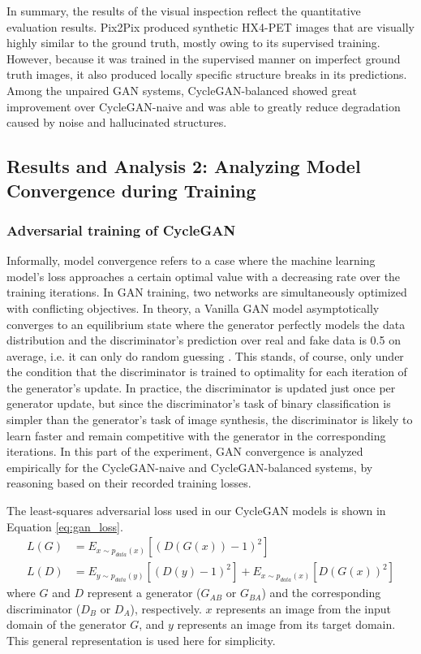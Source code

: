 In summary, the results of the visual inspection reflect the quantitative evaluation results. Pix2Pix produced synthetic HX4-PET images that are visually highly similar to the ground truth, mostly owing to its supervised training. However, because it was trained in the supervised manner on imperfect ground truth images, it also produced locally specific structure breaks in its predictions. Among the unpaired GAN systems, CycleGAN-balanced showed great improvement over CycleGAN-naive and was able to greatly reduce degradation caused by noise and hallucinated structures.


\subsection{Results and Analysis 2: Analyzing Model Convergence during Training}
\label{cycelgan_convergence}


\subsubsection{Adversarial training of CycleGAN} 
Informally, model convergence refers to a case where the machine learning model's loss approaches a certain optimal value with a decreasing rate over the training iterations. In GAN training, two networks are simultaneously optimized with conflicting objectives. In theory, a Vanilla GAN model asymptotically converges to an equilibrium state where the generator perfectly models the data distribution and the discriminator's prediction over real and fake data is 0.5 on average, i.e. it can only do random guessing \cite{goodfellow2014generative}. This stands, of course, only under the condition that the discriminator is trained to optimality for each iteration of the generator's update. In practice, the discriminator is updated just once per generator update, but since the discriminator's task of binary classification is simpler than the generator's task of image synthesis, the discriminator is likely to learn faster and remain competitive with the generator in the corresponding iterations. In this part of the experiment, GAN convergence is analyzed empirically for the CycleGAN-naive and CycleGAN-balanced systems, by reasoning based on their recorded training losses.

The least-squares adversarial loss used in our CycleGAN models is shown in Equation \ref{eq:gan_loss}.
\begin{equation}
    \begin{aligned}
    L(G) &= E_{x \sim p_{data}(x)} [(D(G(x)) - 1)^2] \\
    L(D) &= E_{y \sim p_{data}(y)} [(D(y) - 1)^2] + E_{x \sim p_{data}(x)} [D(G(x))^2]
    \end{aligned}
    \label{eq:gan_loss}
\end{equation}
where $G$ and $D$ represent a generator ($G_{AB}$ or $G_{BA}$) and the corresponding discriminator ($D_B$ or $D_A$), respectively. $x$ represents an image from the input domain of the generator $G$, and $y$ represents an image from its target domain. This general representation is used here for simplicity. 

